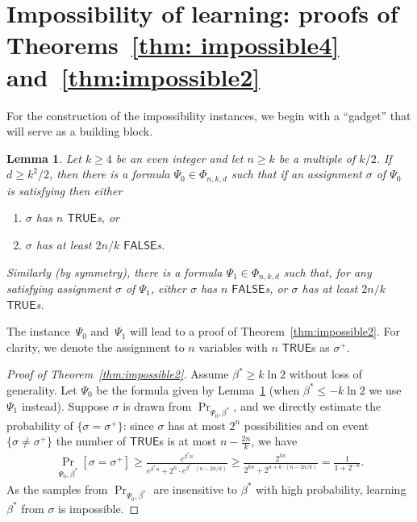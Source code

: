 \documentclass[11pt]{article}
\newtheorem{lemma}[theorem]{Lemma}
\theoremstyle{definition}
\theoremstyle{remark}
\def\TRUE{\mathsf{TRUE}}
\def\FALSE{\mathsf{FALSE}}
\begin{document}
\section{Impossibility of learning: proofs of Theorems~\ref{thm: impossible4} and~\ref{thm:impossible2} } 
For the construction of the impossibility instances, we begin with a ``gadget'' that will serve as a building block.




\begin{lemma}\label{lem: gadget}
Let $k\ge 4$ be an even integer and let $n\geq k$ be a multiple of $k/2$. If $d\ge k^2/2$, then there is a formula $\Psi_0\in\Phi_{n,k,d}$  such that if an assignment $\sigma$ of $\Psi_0$   is satisfying then either 
    \begin{enumerate}
        \item $\sigma$ has $n$ $\TRUE$s, or
        \item $\sigma$ has at least $2n/k$ $\FALSE$s.  
    \end{enumerate}
Similarly (by symmetry), there is a formula $\Psi_1 \in \Phi_{n,k,d}$ such that, for any satisfying assignment $\sigma$ of $\Psi_1$, either   $\sigma$ has $n$  $\FALSE$s, or $\sigma$ has at least $2n/k$  $\TRUE$s.   
\end{lemma}
The instance~$\Psi_0$ and~$\Psi_1$ will lead to a proof of Theorem~\ref{thm:impossible2}.
For clarity, we denote the assignment to $n$ variables with 
$n$ $\TRUE$s as $\sigma^+$.
\begin{proof}[Proof of Theorem~\ref{thm:impossible2}]
    Assume $\beta^* \ge k \ln 2$ without loss of generality.
    Let $\Psi_0$ be the formula given by Lemma~\ref{lem: gadget} (when $\beta^* \leq -k\ln 2$ we use $\Psi_1$ instead).
    Suppose $\sigma$ is drawn from $\Pr_{\Psi_0, \beta^*}$, and we directly estimate the probability of $\{\sigma = \sigma^+\}$:
    since $\sigma$ has at most $2^n$ possibilities and on event $\{\sigma\neq \sigma^+\}$ the number of $\TRUE$s is at most $n-\frac{2n}{k}$, we have
    \begin{align*}
        \Pr_{\Psi_0, \beta^*}[\sigma = \sigma^+] \ge 
        \frac{e^{\beta^*n}}{e^{\beta^*n} + 2^n \cdot e^{\beta^* \cdot  (n - 2n/k)}} \ge \frac{2^{kn}}{2^{kn} + 2^{n+k\cdot(n-2n/k)}}
        = \frac{1}{1+2^{-n}}.
    \end{align*}
    As the samples from $\Pr_{\Psi_0, \beta^*}$ are insensitive to $\beta^*$ with high probability, learning $\beta^*$ from $\sigma$ is impossible.
\end{proof}
\end{document}
